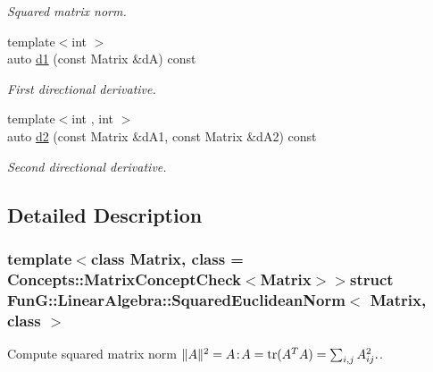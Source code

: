 \begin{DoxyCompactItemize}
\begin{DoxyCompactList}\small\item\em Squared matrix norm. \end{DoxyCompactList}\item 
\hypertarget{structFunG_1_1LinearAlgebra_1_1SquaredEuclideanNorm_a82208c4053803bb2021506edcc7cc23a}{{\footnotesize template$<$int $>$ }\\auto \hyperlink{structFunG_1_1LinearAlgebra_1_1SquaredEuclideanNorm_a82208c4053803bb2021506edcc7cc23a}{d1} (const Matrix \&d\-A) const }\label{structFunG_1_1LinearAlgebra_1_1SquaredEuclideanNorm_a82208c4053803bb2021506edcc7cc23a}

\begin{DoxyCompactList}\small\item\em First directional derivative. \end{DoxyCompactList}\item 
\hypertarget{structFunG_1_1LinearAlgebra_1_1SquaredEuclideanNorm_a0f729cb096015deb5ba01039e8f2215e}{{\footnotesize template$<$int , int $>$ }\\auto \hyperlink{structFunG_1_1LinearAlgebra_1_1SquaredEuclideanNorm_a0f729cb096015deb5ba01039e8f2215e}{d2} (const Matrix \&d\-A1, const Matrix \&d\-A2) const }\label{structFunG_1_1LinearAlgebra_1_1SquaredEuclideanNorm_a0f729cb096015deb5ba01039e8f2215e}

\begin{DoxyCompactList}\small\item\em Second directional derivative. \end{DoxyCompactList}\end{DoxyCompactItemize}


\subsection{Detailed Description}
\subsubsection*{template$<$class Matrix, class = Concepts\-::\-Matrix\-Concept\-Check$<$\-Matrix$>$$>$struct Fun\-G\-::\-Linear\-Algebra\-::\-Squared\-Euclidean\-Norm$<$ Matrix, class $>$}

Compute squared matrix norm $ \|A\|^2 = A\negthinspace : \negthinspace A = \mathrm{tr}(A^TA) = \sum_{i,j} A_{ij}^2. $. 

